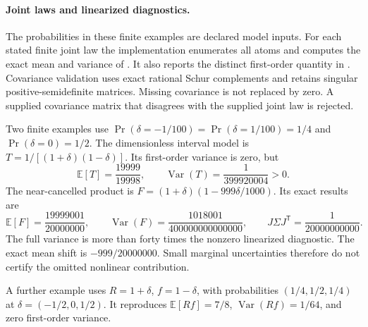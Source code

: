 \paragraph{Joint laws and linearized diagnostics.}
The probabilities in these finite examples are declared model inputs.
For each stated finite joint law the implementation enumerates all atoms and
computes the exact mean and variance of
. It also reports the distinct first-order
quantity in . Covariance validation
uses exact rational Schur complements and retains singular positive-semidefinite
matrices. Missing covariance is not replaced by zero. A supplied covariance
matrix that disagrees with the supplied joint law is rejected.

Two finite examples use
\(\Pr(\delta=-1/100)=\Pr(\delta=1/100)=1/4\) and
\(\Pr(\delta=0)=1/2\). The dimensionless interval model is
\(T=1/[(1+\delta)(1-\delta)]\). Its first-order variance is zero, but
\[
 \mathbb E[T]=\frac{19999}{19998},\qquad
 \operatorname{Var}(T)=\frac{1}{399920004}>0.
\]
The near-cancelled product is
\(F=(1+\delta)(1-999\delta/1000)\). Its exact results are
\[
 \mathbb E[F]=\frac{19999001}{20000000},\qquad
 \operatorname{Var}(F)=\frac{1018001}{400000000000000},\qquad
 J\Sigma J^{\mathsf T}=\frac{1}{20000000000}.
\]
The full variance is more than forty times the nonzero linearized diagnostic.
The exact mean shift is \(-999/20000000\). Small marginal uncertainties
therefore do not certify the omitted nonlinear contribution.

A further example uses
\(R=1+\delta\), \(f=1-\delta\), with probabilities \((1/4,1/2,1/4)\)
at \(\delta=(-1/2,0,1/2)\). It reproduces
\(\mathbb E[Rf]=7/8\), \(\operatorname{Var}(Rf)=1/64\), and zero
first-order variance.

